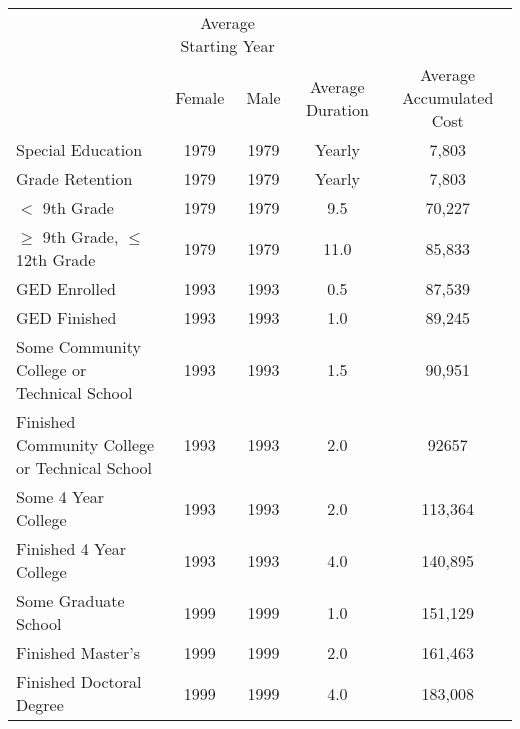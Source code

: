 \begin{tabular}{lcccc} \hline \hline
 & \multicolumn{2}{c}{Average Starting Year} & & \\
 & Female  & Male  & Average Duration  & Average Accumulated Cost  \\  \hline 
Special Education &      1979 &      1979 &      Yearly &     7,803 \\ 
Grade Retention &      1979 &      1979 &        Yearly &     7,803 \\  
$< $ 9th Grade &      1979 &      1979 &       9.5 &     70,227 \\  
$\geq$ 9th Grade, $\leq$ 12th Grade &      1979 &      1979 &      11.0 &     85,833 \\  
GED Enrolled &      1993 &      1993 &       0.5 &     87,539 \\  
GED Finished &      1993 &      1993 &       1.0 &     89,245 \\  
Some Community College or Technical School &      1993 &      1993 &       1.5 &     90,951 \\  
Finished Community College or Technical School  &      1993 &      1993 &       2.0 &     92657 \\  
Some 4 Year College &      1993 &      1993 &       2.0 &    113,364 \\  
Finished 4 Year College &      1993 &      1993 &       4.0 &    140,895 \\  
Some Graduate School &      1999 &      1999 &       1.0 &    151,129 \\  
Finished Master's &      1999 &      1999 &       2.0 &    161,463 \\  
Finished Doctoral Degree &      1999 &      1999 &       4.0 &    183,008 \\  
\hline \hline \end{tabular}
